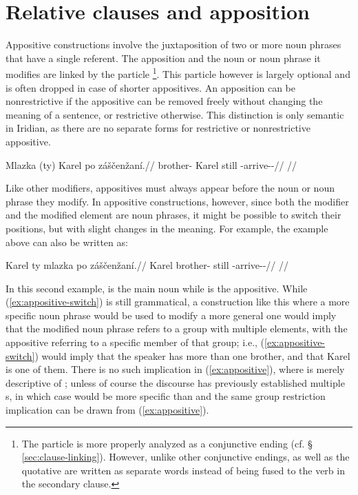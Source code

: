 \section{Relative clauses and apposition}
\label{sec:relative-clauses}

Appositive constructions involve the juxtaposition of two or
more noun phrases that have a single referent. The apposition and the noun or
noun phrase it modifies are linked by the particle \footnote{The
particle  is more properly analyzed as a conjunctive ending (cf.
\S\,\ref{sec:clause-linking}). However, unlike other conjunctive endings,
 as well as the quotative  are written as separate words instead
of being fused to the verb in the secondary clause.}. This particle however is
largely optional and is often dropped in case of shorter appositives. An
apposition can be nonrestrictive if the appositive can be removed freely without
changing the meaning of a sentence, or restrictive otherwise. This distinction
is only semantic in Iridian, as there are no separate forms for restrictive or
nonrestrictive appositive.

\pex\label{ex:appositive}
\begingl
  \gla Mlazka (ty) Karel po záščenžaní.//
  \glb brother-\Dim{} \Rel{} Karel still \Neg{}-arrive-\Av{}-\Ret{}//
  \glft {}//
\endgl
\xe

Like other modifiers, appositives must always appear before the noun or noun
phrase they modify. In appositive constructions, however, since both the
modifier and the modified element are noun phrases, it might be possible to
switch their positions, but with slight changes in the meaning. For example, the
example above can also be written as:

\pex\label{ex:appositive-switch}
\begingl
  \gla {}Karel ty mlazka po záščenžaní.//
  \glb Karel \Lnk{} brother-\Dim{} still \Neg{}-arrive-\Av{}-\Ret{}//
  \glft {}//
\endgl
\xe

In this second example,  is the main noun while  is the
appositive. While (\ref{ex:appositive-switch}) is still grammatical, a
construction like this where a more specific noun phrase would be used to modify
a more general one would imply that the modified noun phrase refers to a group
with multiple elements, with the appositive referring to a specific member of
that group; i.e., (\ref{ex:appositive-switch}) would imply that the speaker has
more than one brother, and that Karel is one of them. There is no such
implication in (\ref{ex:appositive}), where  is merely descriptive
of ; unless of course the discourse has previously established
multiple s, in which case  would be more specific than
 and the same group restriction implication can be drawn from
(\ref{ex:appositive}).

